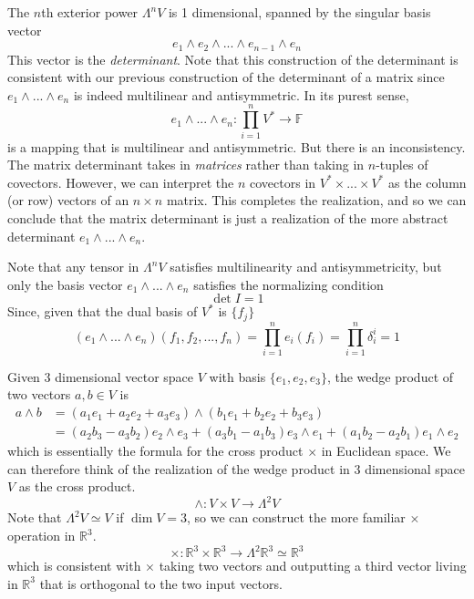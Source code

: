  \begin{definition}
  The $n$th exterior power $\Lambda^n V$ is 1 dimensional, spanned by the singular basis vector 
  \[e_1 \wedge e_2 \wedge ... \wedge e_{n-1} \wedge e_n\]
  This vector is the \textit{determinant}. Note that this construction of the determinant is consistent with our previous construction of the determinant of a matrix since $e_1 \wedge ... \wedge e_n$ is indeed multilinear and antisymmetric. In its purest sense, 
  \[e_1 \wedge ... \wedge e_n: \prod_{i=1}^n V^* \longrightarrow \mathbb{F}\]
  is a mapping that is multilinear and antisymmetric. But there is an inconsistency. The matrix determinant takes in \textit{matrices} rather than taking in $n$-tuples of covectors. However, we can interpret the $n$ covectors in $V^* \times ... \times V^*$ as the column (or row) vectors of an $n \times n$ matrix. This completes the realization, and so we can conclude that the matrix determinant is just a realization of the more abstract determinant $e_1 \wedge ... \wedge e_n$. 

  Note that any tensor in $\Lambda^n V$ satisfies multilinearity and antisymmetricity, but only the basis vector $e_1 \wedge ... \wedge e_n$ satisfies the normalizing condition
  \[\det{I} = 1\]
  Since, given that the dual basis of $V^*$ is $\{f_j\}$
  \[(e_1 \wedge ... \wedge e_n) (f_1, f_2, ..., f_n) = \prod_{i=1}^n e_i (f_i) = \prod_{i=1}^n \delta_i^i = 1\]
  \end{definition}

  \begin{example}
  Given 3 dimensional vector space $V$ with basis $\{e_1, e_2, e_3\}$, the wedge product of two vectors $a, b \in V$ is 
  \begin{align*}
      a \wedge b & = (a_1 e_1 + a_2 e_2 + a_3 e_3) \wedge (b_1 e_1 + b_2 e_2 + b_3 e_3) \\
      & = (a_2 b_3 - a_3 b_2) e_2 \wedge e_3 + (a_3 b_1 - a_1 b_3) e_3 \wedge e_1 + (a_1 b_2 - a_2 b_1) e_1 \wedge e_2 
  \end{align*}
  which is essentially the formula for the cross product $\times$ in Euclidean space. We can therefore think of the realization of the wedge product in 3 dimensional space $V$ as the cross product. 
  \[\wedge: V \times V \longrightarrow \Lambda^2 V\]
  Note that $\Lambda^2 V \simeq V$ if $\dim{V} = 3$, so we can construct the more familiar $\times$ operation in $\mathbb{R}^3$. 
  \[\times: \mathbb{R}^3 \times \mathbb{R}^3 \longrightarrow \Lambda^2 \mathbb{R}^3 \simeq \mathbb{R}^3\]
  which is consistent with $\times$ taking two vectors and outputting a third vector living in $\mathbb{R}^3$ that is orthogonal to the two input vectors. 
  \end{example}

